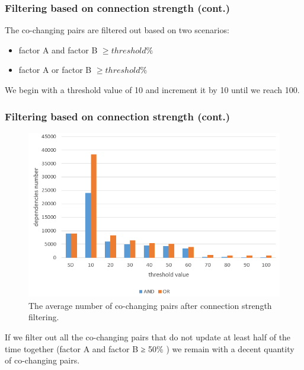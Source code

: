 \documentclass{beamer}
\begin{document}
 \begin{frame}
\frametitle{Filtering based on connection strength (cont.)}

The co-changing pairs are filtered out based on two scenarios:
\begin{itemize}
	\item factor A and factor B $\geq threshold \%$ 
	\item factor A or factor B $\geq threshold \%$ 
\end{itemize}
 \vskip 0.3cm 
We begin with a threshold value of 10 and increment it by 10 until we reach 100. 

\end{frame}

 \begin{frame}
\frametitle{Filtering based on connection strength (cont.)}

\begin{center}
     \begin{figure}
	\includegraphics[width=\textwidth]{strength_results.PNG}
	\caption{\label{fig:fig1} The average number of co-changing pairs after connection strength filtering.}
     \end{figure}
\end{center}

If we filter out all the co-changing pairs that do not update at least half of the
time together (factor A and factor B ≥ 50\% ) we remain with a decent quantity of co-changing pairs.

\end{frame}
\end{document}

